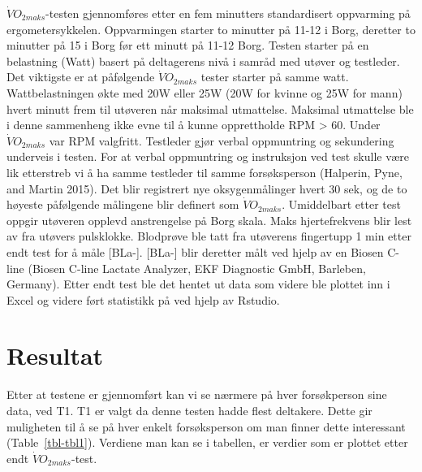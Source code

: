 \documentclass[
  letterpaper,
  DIV=11,
  numbers=noendperiod]{scrreprt}
\begin{document}
\(\dot{V}O_{2maks}\)-testen gjennomføres etter en fem minutters
standardisert oppvarming på ergometersykkelen. Oppvarmingen starter to
minutter på 11-12 i Borg, deretter to minutter på 15 i Borg før ett
minutt på 11-12 Borg. Testen starter på en belastning (Watt) basert på
deltagerens nivå i samråd med utøver og testleder. Det viktigste er at
påfølgende \(\dot{V}O_{2maks}\) tester starter på samme watt.
Wattbelastningen økte med 20W eller 25W (20W for kvinne og 25W for mann)
hvert minutt frem til utøveren når maksimal utmattelse. Maksimal
utmattelse ble i denne sammenheng ikke evne til å kunne opprettholde RPM
\textgreater{} 60. Under \(\dot{V}O_{2maks}\) var RPM valgfritt.
Testleder gjør verbal oppmuntring og sekundering underveis i testen. For
at verbal oppmuntring og instruksjon ved test skulle være lik etterstreb
vi å ha samme testleder til samme forsøksperson (Halperin, Pyne, and
Martin 2015). Det blir registrert nye oksygenmålinger hvert 30 sek, og
de to høyeste påfølgende målingene blir definert som
\(\dot{V}O_{2maks}\). Umiddelbart etter test oppgir utøveren opplevd
anstrengelse på Borg skala. Maks hjertefrekvens blir lest av fra utøvers
pulsklokke. Blodprøve ble tatt fra utøverens fingertupp 1 min etter endt
test for å måle {[}BLa-{]}. {[}BLa-{]} blir deretter målt ved hjelp av
en Biosen C-line (Biosen C-line Lactate Analyzer, EKF Diagnostic GmbH,
Barleben, Germany). Etter endt test ble det hentet ut data som videre
ble plottet inn i Excel og videre ført statistikk på ved hjelp av
Rstudio.

\section{Resultat}\label{resultat}

Etter at testene er gjennomført kan vi se nærmere på hver forsøkperson
sine data, ved T1. T1 er valgt da denne testen hadde flest deltakere.
Dette gir muligheten til å se på hver enkelt forsøksperson om man finner
dette interessant (Table~\ref{tbl-tbl1}). Verdiene man kan se i
tabellen, er verdier som er plottet etter endt
\(\dot{V}O_{2maks}\)-test.
\end{document}
